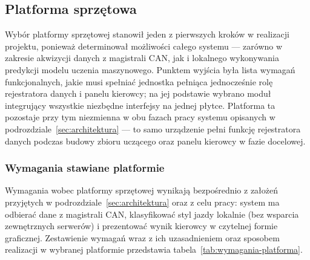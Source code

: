 \subsection{Platforma sprzętowa}
\label{sec:platforma}

Wybór platformy sprzętowej stanowił jeden z pierwszych kroków w realizacji
projektu, ponieważ determinował możliwości całego systemu --- zarówno
w zakresie akwizycji danych z magistrali CAN, jak i lokalnego wykonywania
predykcji modelu uczenia maszynowego. Punktem wyjścia była lista wymagań
funkcjonalnych, jakie musi spełniać jednostka pełniąca jednocześnie rolę
rejestratora danych i panelu kierowcy; na jej podstawie wybrano moduł
integrujący wszystkie niezbędne interfejsy na jednej płytce. Platforma ta
pozostaje przy tym niezmienna w obu fazach pracy systemu opisanych
w podrozdziale~\ref{sec:architektura} --- to samo urządzenie pełni funkcję
rejestratora danych podczas budowy zbioru uczącego oraz panelu kierowcy
w fazie docelowej.

\subsubsection{Wymagania stawiane platformie}

Wymagania wobec platformy sprzętowej wynikają bezpośrednio z założeń
przyjętych w podrozdziale~\ref{sec:architektura} oraz z celu pracy: system ma
odbierać dane z magistrali CAN, klasyfikować styl jazdy lokalnie (bez
wsparcia zewnętrznych serwerów) i prezentować wynik kierowcy w czytelnej
formie graficznej. Zestawienie wymagań wraz z ich uzasadnieniem oraz sposobem
realizacji w wybranej platformie przedstawia tabela~\ref{tab:wymagania-platforma}.

